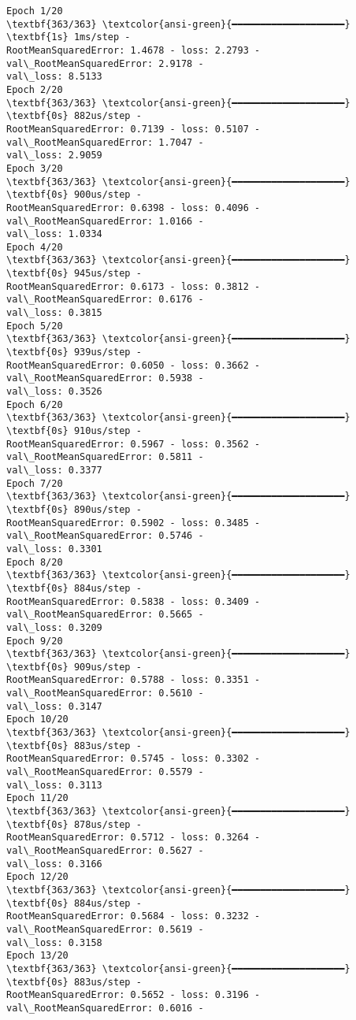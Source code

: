 \documentclass[12pt letter]{report}
\begin{document}
    \begin{Verbatim}[commandchars=\\\{\}]
Epoch 1/20
\textbf{363/363} \textcolor{ansi-green}{━━━━━━━━━━━━━━━━━━━━} \textbf{1s} 1ms/step -
RootMeanSquaredError: 1.4678 - loss: 2.2793 - val\_RootMeanSquaredError: 2.9178 -
val\_loss: 8.5133
Epoch 2/20
\textbf{363/363} \textcolor{ansi-green}{━━━━━━━━━━━━━━━━━━━━} \textbf{0s} 882us/step -
RootMeanSquaredError: 0.7139 - loss: 0.5107 - val\_RootMeanSquaredError: 1.7047 -
val\_loss: 2.9059
Epoch 3/20
\textbf{363/363} \textcolor{ansi-green}{━━━━━━━━━━━━━━━━━━━━} \textbf{0s} 900us/step -
RootMeanSquaredError: 0.6398 - loss: 0.4096 - val\_RootMeanSquaredError: 1.0166 -
val\_loss: 1.0334
Epoch 4/20
\textbf{363/363} \textcolor{ansi-green}{━━━━━━━━━━━━━━━━━━━━} \textbf{0s} 945us/step -
RootMeanSquaredError: 0.6173 - loss: 0.3812 - val\_RootMeanSquaredError: 0.6176 -
val\_loss: 0.3815
Epoch 5/20
\textbf{363/363} \textcolor{ansi-green}{━━━━━━━━━━━━━━━━━━━━} \textbf{0s} 939us/step -
RootMeanSquaredError: 0.6050 - loss: 0.3662 - val\_RootMeanSquaredError: 0.5938 -
val\_loss: 0.3526
Epoch 6/20
\textbf{363/363} \textcolor{ansi-green}{━━━━━━━━━━━━━━━━━━━━} \textbf{0s} 910us/step -
RootMeanSquaredError: 0.5967 - loss: 0.3562 - val\_RootMeanSquaredError: 0.5811 -
val\_loss: 0.3377
Epoch 7/20
\textbf{363/363} \textcolor{ansi-green}{━━━━━━━━━━━━━━━━━━━━} \textbf{0s} 890us/step -
RootMeanSquaredError: 0.5902 - loss: 0.3485 - val\_RootMeanSquaredError: 0.5746 -
val\_loss: 0.3301
Epoch 8/20
\textbf{363/363} \textcolor{ansi-green}{━━━━━━━━━━━━━━━━━━━━} \textbf{0s} 884us/step -
RootMeanSquaredError: 0.5838 - loss: 0.3409 - val\_RootMeanSquaredError: 0.5665 -
val\_loss: 0.3209
Epoch 9/20
\textbf{363/363} \textcolor{ansi-green}{━━━━━━━━━━━━━━━━━━━━} \textbf{0s} 909us/step -
RootMeanSquaredError: 0.5788 - loss: 0.3351 - val\_RootMeanSquaredError: 0.5610 -
val\_loss: 0.3147
Epoch 10/20
\textbf{363/363} \textcolor{ansi-green}{━━━━━━━━━━━━━━━━━━━━} \textbf{0s} 883us/step -
RootMeanSquaredError: 0.5745 - loss: 0.3302 - val\_RootMeanSquaredError: 0.5579 -
val\_loss: 0.3113
Epoch 11/20
\textbf{363/363} \textcolor{ansi-green}{━━━━━━━━━━━━━━━━━━━━} \textbf{0s} 878us/step -
RootMeanSquaredError: 0.5712 - loss: 0.3264 - val\_RootMeanSquaredError: 0.5627 -
val\_loss: 0.3166
Epoch 12/20
\textbf{363/363} \textcolor{ansi-green}{━━━━━━━━━━━━━━━━━━━━} \textbf{0s} 884us/step -
RootMeanSquaredError: 0.5684 - loss: 0.3232 - val\_RootMeanSquaredError: 0.5619 -
val\_loss: 0.3158
Epoch 13/20
\textbf{363/363} \textcolor{ansi-green}{━━━━━━━━━━━━━━━━━━━━} \textbf{0s} 883us/step -
RootMeanSquaredError: 0.5652 - loss: 0.3196 - val\_RootMeanSquaredError: 0.6016 -

\end{Verbatim}
\end{document}
